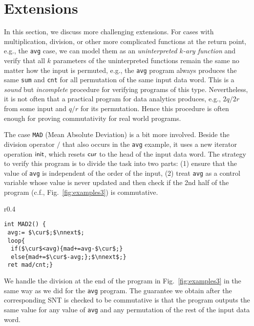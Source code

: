 \section{Extensions}
\label{sec:cases}



In this section, we discuss more challenging extensions. 
For cases with multiplication, division, or other more complicated functions at the return point, e.g., the \texttt{avg} case, we can model them as an \emph{uninterpreted $k$-ary function} and verify that all $k$ parameters of the uninterpreted functions remain the same no matter how the input is permuted, e.g., the \texttt{avg} program always produces the same \texttt{sum} and \texttt{cnt} for all permutation of the same input data word. This is a \emph{sound} but \emph{incomplete} procedure for verifying programs of this type. Nevertheless, it is not often that a  practical program for data analytics produces, e.g., $2q/2r$ from some input and $q/r$ for its permutation. Hence this procedure is often enough for proving commutativity for real world programs.

The case \texttt{MAD} (Mean Absolute Deviation) is a bit more involved. Beside the division operator $/$ that also occurs in the \texttt{avg} example, it uses a new iterator operation $\mathsf{init}$, which resets $\mathsf{cur}$ to the head of the input data word. The strategy to verify this program is to divide the task into two parts: (1) ensure that the value of \texttt{avg} is independent of the order of the input, (2) treat \texttt{avg} as a control variable whose value is never updated and then check if the 2nd half of the program (c.f., Fig.~\ref{fig:examples3}) is commutative. 

\begin{wrapfigure}{r}{0.4\textwidth}
	\vspace{-0.8cm}
	\lstset{language=C,
		basicstyle=\ttfamily\scriptsize}
	\begin{lstlisting}[mathescape=true]
int MAD2() {
 avg:= $\cur$;$\nnext$;
 loop{
  if($\cur$<avg){mad+=avg-$\cur$;}
  else{mad+=$\cur$-avg;};$\nnext$;}
 ret mad/cnt;}
	\end{lstlisting}	
	\vspace{-0.4cm}
	\caption{The 2nd half of MAD}
	\label{fig:examples3}
	\vspace{-0.7cm}
\end{wrapfigure}
We handle the division at the end of the program in Fig.~\ref{fig:examples3} in the same way as we did for the \texttt{avg} program. The guarantee we obtain after the corresponding SNT is checked to be commutative is that the program outputs the same value for any value of \texttt{avg} and any permutation of the rest of the input data word. 



